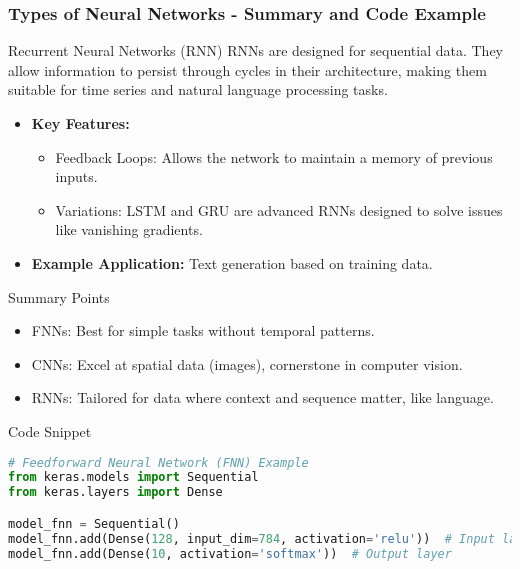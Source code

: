 \documentclass{beamer}
\begin{document}
\begin{frame}
    \frametitle{Types of Neural Networks - Summary and Code Example}
    \begin{block}{Recurrent Neural Networks (RNN)}
        RNNs are designed for sequential data. They allow information to persist through cycles in their architecture, making them suitable for time series and natural language processing tasks.
    \end{block}
    
    \begin{itemize}
        \item \textbf{Key Features:}
        \begin{itemize}
            \item Feedback Loops: Allows the network to maintain a memory of previous inputs.
            \item Variations: LSTM and GRU are advanced RNNs designed to solve issues like vanishing gradients.
        \end{itemize}
        \item \textbf{Example Application:} Text generation based on training data.
    \end{itemize}
    
    \begin{block}{Summary Points}
        \begin{itemize}
            \item FNNs: Best for simple tasks without temporal patterns.
            \item CNNs: Excel at spatial data (images), cornerstone in computer vision.
            \item RNNs: Tailored for data where context and sequence matter, like language.
        \end{itemize}
    \end{block}
    
    \begin{block}{Code Snippet}
        \begin{lstlisting}[language=Python]
# Feedforward Neural Network (FNN) Example
from keras.models import Sequential
from keras.layers import Dense

model_fnn = Sequential()
model_fnn.add(Dense(128, input_dim=784, activation='relu'))  # Input layer
model_fnn.add(Dense(10, activation='softmax'))  # Output layer
        \end{lstlisting}
    \end{block}
\end{frame}
\end{document}
